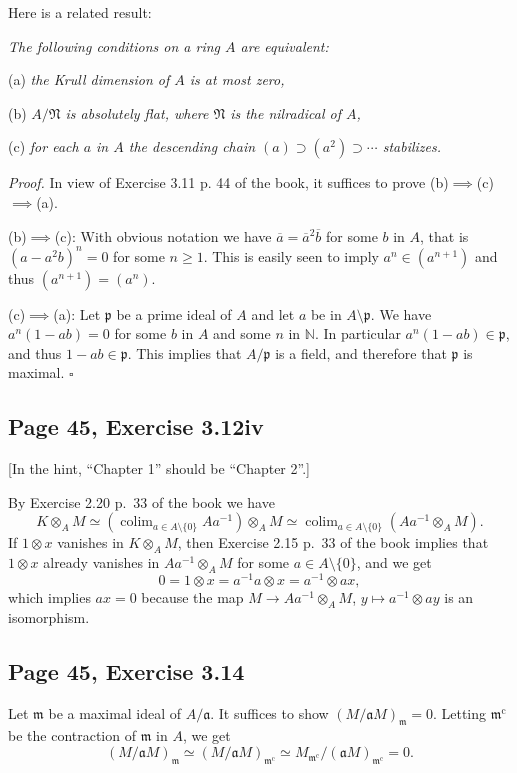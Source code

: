 \documentclass[parskip=half,fontsize=12pt]{scrartcl}%
\newcommand{\oo}{\operatorname}\newcommand{\ooo}{\operatorname*}
\newcommand{\mf}{\mathfrak}
\newcommand{\aaa}{\mf a}
\newcommand{\mmm}{\mf m}
\newcommand{\ppp}{\mf p}
\DeclareMathOperator*{\colim}{colim}
\begin{document}
Here is a related result:

\emph{The following conditions on a ring $A$ are equivalent:}

(a) \emph{the Krull dimension of $A$ is at most zero,}

(b) \emph{$A/\mf N$ is absolutely flat, where $\mf N$ is the nilradical of $A$,}

(c) \emph{for each $a$ in $A$ the descending chain $(a)\supset(a^2)\supset\cdots$ stabilizes.}

\emph{Proof.} In view of Exercise 3.11 p. 44 of the book, it suffices to prove (b)$\implies$(c)$\implies$(a). 

(b)$\implies$(c): With obvious notation we have $\overline a=\overline a^2\overline b$ for some $b$ in $A$, that is $(a-a^2b)^n=0$ for some $n\ge1$. This is easily seen to imply $a^n\in(a^{n+1})$ and thus $(a^{n+1})=(a^n)$. 

(c)$\implies$(a): Let $\ppp$ be a prime ideal of $A$ and let $a$ be in $A\setminus\ppp$. We have $a^n(1-ab)=0$ for some $b$ in $A$ and some $n$ in $\mathbb N$. In particular $a^n(1-ab)\in\ppp$, and thus $1-ab\in\ppp$. This implies that $A/\ppp$ is a field, and therefore that $\ppp$ is maximal. $\square$

\subsection{Page 45, Exercise 3.12iv}%

[In the hint, ``Chapter 1'' should be ``Chapter 2''.]

By Exercise 2.20 p.~33 of the book we have 
$$
K\otimes_AM\simeq\left(\colim_{a\in A\setminus\{0\}}Aa^{-1}\right)\otimes_AM\simeq\colim_{a\in A\setminus\{0\}}\left(Aa^{-1}\otimes_AM\right).
$$ 
If $1\otimes x$ vanishes in $K\otimes_AM$, then Exercise 2.15 p.~33 of the book implies that $1\otimes x$ already vanishes in $Aa^{-1}\otimes_AM$ for some $a\in A\setminus\{0\}$, and we get 
$$
0=1\otimes x=a^{-1}a\otimes x=a^{-1}\otimes ax,
$$ 
which implies $ax=0$ because the map $M\to Aa^{-1}\otimes_AM$, $y\mapsto a^{-1}\otimes ay$ is an isomorphism. %

\subsection{Page 45, Exercise 3.14}%

Let $\mmm$ be a maximal ideal of $A/\aaa$. It suffices to show $(M/\aaa M)_\mmm=0$. Letting $\mmm^{\oo c}$ be the contraction of $\mmm$ in $A$, we get 
$$
(M/\aaa M)_\mmm\simeq(M/\aaa M)_{\mmm^{\oo c}}\simeq M_{\mmm^{\oo c}}/(\aaa M)_{\mmm^{\oo c}}=0.
$$ 
\end{document}

